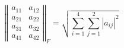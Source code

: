 \begin{equation*}
 \left\Vert\begin{matrix}
 a_{11}&a_{12}\\ a_{21}&a_{22}\\
 a_{31}&a_{32}\\ a_{41}&a_{42}
 \end{matrix}\right\Vert_F
 =\sqrt{\sum_{i=1}^4\sum_{j=1}^2
              |a_{ij}|^2}
\end{equation*}
